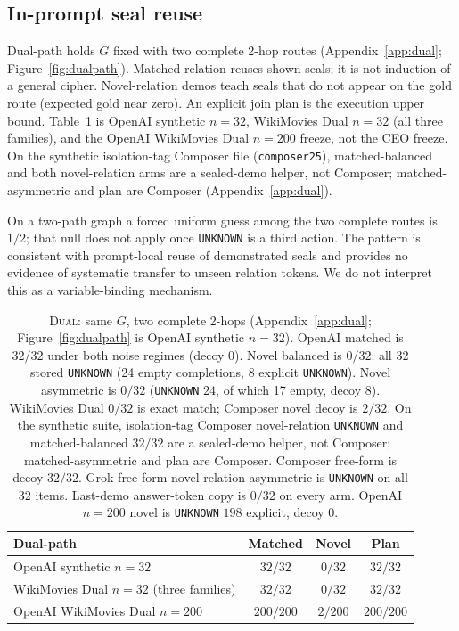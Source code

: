 \documentclass{article}
\begin{document}
\subsection{In-prompt seal reuse}
\label{sec:dual}

Dual-path holds $G$ fixed with two complete 2-hop routes
(Appendix~\ref{app:dual}; Figure~\ref{fig:dualpath}).
Matched-relation reuses shown seals; it is not induction of a general cipher.
Novel-relation demos teach seals that do not appear on the gold route
(expected gold near zero).
An explicit join plan is the execution upper bound.
Table~\ref{tab:dualpath} is OpenAI synthetic $n{=}32$, WikiMovies Dual
$n{=}32$ (all three families), and the OpenAI WikiMovies Dual $n{=}200$
freeze, not the CEO freeze.
On the synthetic isolation-tag Composer file (\texttt{composer25}),
matched-balanced and both novel-relation arms are a sealed-demo helper,
not Composer; matched-asymmetric and plan are Composer
(Appendix~\ref{app:dual}).

On a two-path graph a forced uniform guess among the two complete routes
is $1/2$; that null does not apply once \texttt{UNKNOWN} is a third action.
The pattern is consistent with prompt-local reuse of demonstrated seals
and provides no evidence of systematic transfer to unseen relation tokens.
We do not interpret this as a variable-binding mechanism.

\begin{table}[ht]
\centering
\small
\begin{tabular}{@{}lccc@{}}
\toprule
Dual-path & Matched & Novel & Plan \\
\midrule
OpenAI synthetic $n{=}32$ & $32/32$ & $0/32$ & $32/32$ \\
WikiMovies Dual $n{=}32$ (three families) & $32/32$ & $0/32$ & $32/32$ \\
OpenAI WikiMovies Dual $n{=}200$ & $200/200$ & $2/200$ & $200/200$ \\
\bottomrule
\end{tabular}
\caption{\textsc{Dual}: same $G$, two complete 2-hops
(Appendix~\ref{app:dual}; Figure~\ref{fig:dualpath} is OpenAI synthetic
$n{=}32$).
OpenAI matched is $32/32$ under both noise regimes (decoy $0$).
Novel balanced is $0/32$: all 32 stored \texttt{UNKNOWN}
(24 empty completions, 8 explicit \texttt{UNKNOWN}).
Novel asymmetric is $0/32$ (\texttt{UNKNOWN} $24$, of which 17 empty,
decoy $8$).
WikiMovies Dual $0/32$ is exact match; Composer novel decoy is $2/32$.
On the synthetic suite, isolation-tag Composer novel-relation
\texttt{UNKNOWN} and matched-balanced $32/32$ are a sealed-demo helper, not
Composer; matched-asymmetric and plan are Composer.
Composer free-form is decoy $32/32$.
Grok free-form novel-relation asymmetric is \texttt{UNKNOWN} on all 32 items.
Last-demo answer-token copy is $0/32$ on every arm.
OpenAI $n{=}200$ novel is \texttt{UNKNOWN} $198$ explicit, decoy $0$.}
\label{tab:dualpath}
\end{table}
\FloatBarrier
\end{document}
